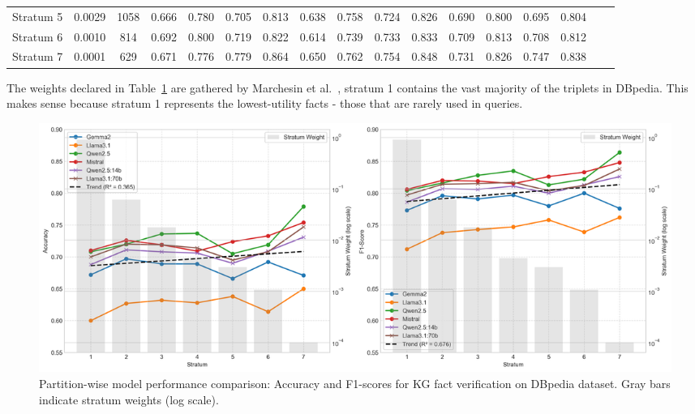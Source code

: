 \begin{table}[ht!]
{\begin{tabular}{lcccccccccccccccc}
            Stratum 5    &  0.0029   & 1058 & 0.666                & 0.780             & 0.705                 & 0.813                 & 0.638                   & 0.758               & 0.724                   & 0.826          & 0.690                      & 0.800               & 0.695                       & 0.804       \\
            Stratum 6    &  0.0010   & 814  & 0.692                & 0.800             & 0.719                 & 0.822                 & 0.614                   & 0.739               & 0.733                   & 0.833          & 0.709                      & 0.813               & 0.708                       & 0.812       \\
            Stratum 7    &  0.0001   & 629  & 0.671                & 0.776             & 0.779                 & 0.864                 & 0.650                   & 0.762               & 0.754                   & 0.848          & 0.731                      & 0.826               & 0.747                       & 0.838       \\
            \bottomrule
        \end{tabular}}
    \label{tab:evaluation_results-partition-wise-dbpedia}
\end{table}

The weights declared in Table~\ref{tab:evaluation_results-partition-wise-dbpedia} are gathered by Marchesin et al.~\cite{Marchesin_Silvello_Alonso_2024}, stratum 1 contains the vast majority of the triplets in DBpedia.
This makes sense because stratum 1 represents the lowest-utility facts - those that are rarely used in queries.

\begin{figure}[ht!]
    \centering
    \begin{minipage}[b]{\textwidth}
        \centering
        \includegraphics[width=\textwidth]{res/F1_ACC_Analysis_Across_Stratum}
    \end{minipage}
    \caption{Partition-wise model performance comparison: Accuracy and F1-scores for \ac{KG} fact verification on DBpedia dataset. Gray bars indicate stratum weights (log scale).}
    \label{fig:F1_ACC_Analysis_Across_Stratum}
\end{figure}

